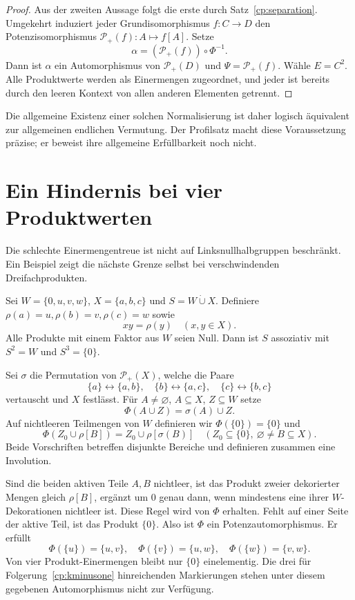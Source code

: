 \documentclass[a4paper,11pt]{article}
\newcommand{\Pp}[1]{\mathcal P_+(#1)}
\begin{document}
\begin{proof}
Aus der zweiten Aussage folgt die erste durch
Satz~\ref{cp:separation}. Umgekehrt induziert jeder
Grundisomorphismus \(f:C\to D\) den Potenzisomorphismus
\(\Pp f:A\mapsto f[A]\). Setze
\[
 \alpha=(\Pp f)\circ\Phi^{-1}.
\]
Dann ist \(\alpha\) ein Automorphismus von \(\Pp D\) und
\(\Psi=\Pp f\). Wähle \(E=C^2\). Alle Produktwerte werden als
Einermengen zugeordnet, und jeder ist bereits durch den leeren
Kontext von allen anderen Elementen getrennt.
\end{proof}

Die allgemeine Existenz einer solchen Normalisierung ist daher
logisch äquivalent zur allgemeinen endlichen Vermutung.
Der Profilsatz macht diese Voraussetzung präzise; er beweist
ihre allgemeine Erfüllbarkeit noch nicht.

\section{Ein Hindernis bei vier Produktwerten}

Die schlechte Einermengentreue ist nicht auf Linksnullhalbgruppen
beschränkt. Ein Beispiel zeigt die nächste Grenze selbst bei
verschwindenden Dreifachprodukten.

Sei \(W=\{0,u,v,w\}\), \(X=\{a,b,c\}\) und
\(S=W\mathbin{\dot\cup}X\). Definiere
\(\rho(a)=u,\rho(b)=v,\rho(c)=w\) sowie
\[
 xy=\rho(y)\quad(x,y\in X).
\]
Alle Produkte mit einem Faktor aus \(W\) seien Null.
Dann ist \(S\) assoziativ mit \(S^2=W\) und \(S^3=\{0\}\).

Sei \(\sigma\) die Permutation von \(\Pp X\), welche die Paare
\[
 \{a\}\leftrightarrow\{a,b\},\quad
 \{b\}\leftrightarrow\{a,c\},\quad
 \{c\}\leftrightarrow\{b,c\}
\]
vertauscht und \(X\) festlässt. Für \(A\ne\varnothing\),
\(A\subseteq X\), \(Z\subseteq W\) setze
\[
 \Phi(A\cup Z)=\sigma(A)\cup Z.
\]
Auf nichtleeren Teilmengen von \(W\) definieren wir
\(\Phi(\{0\})=\{0\}\) und
\[
 \Phi(Z_0\cup\rho[B])=Z_0\cup\rho[\sigma(B)]
 \quad
 (Z_0\subseteq\{0\},\ \varnothing\ne B\subseteq X).
\]
Beide Vorschriften betreffen disjunkte Bereiche und definieren
zusammen eine Involution.

Sind die beiden aktiven Teile \(A,B\) nichtleer, ist das Produkt
zweier dekorierter Mengen gleich \(\rho[B]\), ergänzt um \(0\)
genau dann, wenn mindestens eine ihrer \(W\)-Dekorationen
nichtleer ist. Diese Regel wird von \(\Phi\) erhalten.
Fehlt auf einer Seite der aktive Teil, ist das Produkt \(\{0\}\).
Also ist \(\Phi\) ein Potenzautomorphismus. Er erfüllt
\[
 \Phi(\{u\})=\{u,v\},\quad
 \Phi(\{v\})=\{u,w\},\quad
 \Phi(\{w\})=\{v,w\}.
\]
Von vier Produkt-Einermengen bleibt nur \(\{0\}\) einelementig.
Die drei für Folgerung~\ref{cp:kminusone} hinreichenden
Markierungen stehen unter diesem gegebenen Automorphismus nicht
zur Verfügung.
\end{document}
